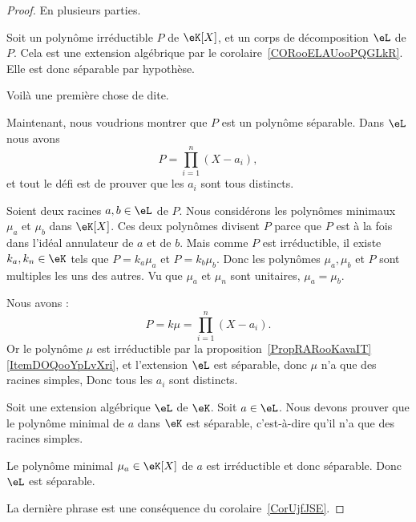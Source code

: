 \begin{proof}

	En plusieurs parties.

	\begin{subproof}

		Soit un polynôme irréductible \( P\) de \( \eK[X]\), et un corps de décomposition \( \eL\) de \( P\). Cela est une extension algébrique par le corolaire~\ref{CORooELAUooPQGLkR}. Elle est donc séparable par hypothèse.

		Voilà une première chose de dite.

		Maintenant, nous voudrions montrer que \( P\) est un polynôme séparable. Dans \( \eL\) nous avons
		\begin{equation}
			P=\prod_{i=1}^n(X-a_i),
		\end{equation}
		et tout le défi est de prouver que les \( a_i\) sont tous distincts.

		Soient deux racines \( a,b\in \eL\) de \( P\). Nous considérons les polynômes minimaux \( \mu_a\) et \( \mu_b\) dans \( \eK[X]\). Ces deux polynômes divisent \( P\) parce que \( P\) est à la fois dans l'idéal annulateur de \( a\) et de \( b\). Mais comme \( P\) est irréductible, il existe \( k_a,k_n\in \eK\) tels que \( P=k_a\mu_a\) et \( P=k_b\mu_b\). Donc les polynômes \( \mu_a,\mu_b\) et \( P\) sont multiples les uns des autres. Vu que \( \mu_a\) et \( \mu_n\) sont unitaires, \( \mu_a=\mu_b\).

		Nous avons :
		\begin{equation}
			P=k\mu=\prod_{i=1}^n(X-a_i).
		\end{equation}
		Or le polynôme \( \mu\) est irréductible par la proposition~\ref{PropRARooKavaIT}\ref{ItemDOQooYpLvXri}, et l'extension \( \eL\) est séparable, donc \( \mu\) n'a que des racines simples, Donc tous les \( a_i\) sont distincts.


		Soit une extension algébrique \( \eL\) de \( \eK\). Soit \( a\in \eL\). Nous devons prouver que le polynôme minimal de \( a\) dans \( \eK\) est séparable, c'est-à-dire qu'il n'a que des racines simples.

		Le polynôme minimal \( \mu_a\in \eK[X]\) de \( a\) est irréductible et donc séparable. Donc \( \eL\) est séparable.

	\end{subproof}

	La dernière phrase est une conséquence du corolaire~\ref{CorUjfJSE}.
\end{proof}

